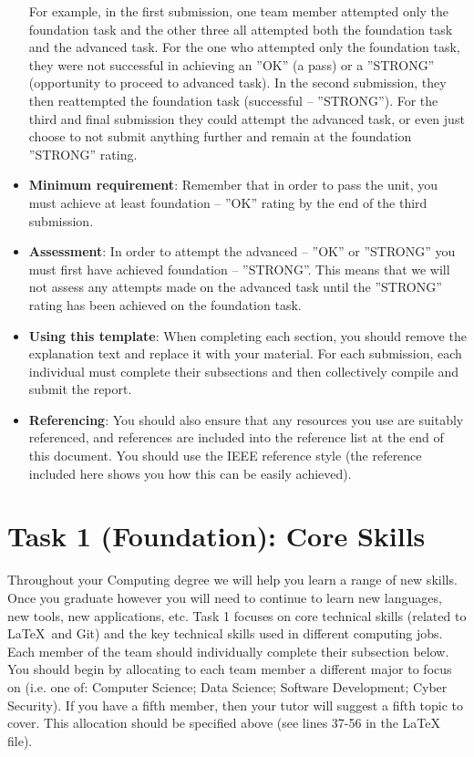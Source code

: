 \documentclass[a4paper, 11pt]{report}
\begin{document}
\begin{itemize}
	For example, in the first submission, one team member attempted only the foundation task and the other three all attempted both the foundation task and the advanced task. For the one who attempted only the foundation task, they were not successful in achieving an ''OK'' (a pass) or a ''STRONG'' (opportunity to proceed to advanced task). In the second submission, they then reattempted the foundation task (successful – ''STRONG''). For the third and final submission they could attempt the advanced task, or even just choose to not submit anything further and remain at the foundation ''STRONG'' rating.
	\item \textbf{Minimum requirement}: Remember that in order to pass the unit, you must achieve at least foundation – ''OK'' rating by the end of the third submission.
	\item \textbf{Assessment}: In order to attempt the advanced – ''OK'' or ''STRONG'' you must first have achieved foundation – ''STRONG''. This means that we will not assess any attempts made on the advanced task until the ''STRONG'' rating has been achieved on the foundation task. 
	\item \textbf{Using this template}: When completing each section, you should remove the explanation text and replace it with your material. For each submission, each individual must complete their subsections and then collectively compile and submit the report.
	\item \textbf{Referencing}: You should also ensure that any resources you use are suitably referenced, and references are included into the reference list at the end of this document. You should use the IEEE reference style \cite{usyd2} (the reference included here shows you how this can be easily achieved).
\end{itemize}



\newpage
\section{Task 1 (Foundation): Core Skills}

Throughout your Computing degree we will help you learn a range of new skills. Once you graduate however you will need to continue to learn new languages, new tools, new applications, etc. Task 1 focuses on core technical skills (related to \LaTeX\ and Git) and the key technical skills used in different computing jobs. Each member of the team should individually complete their subsection below. You should begin by allocating to each team member a different major to focus on (i.e. one of: Computer Science; Data Science; Software Development; Cyber Security). If you have a fifth member, then your tutor will suggest a fifth topic to cover. This allocation should be specified above (see lines 37-56 in the LaTeX file).
\end{document}
